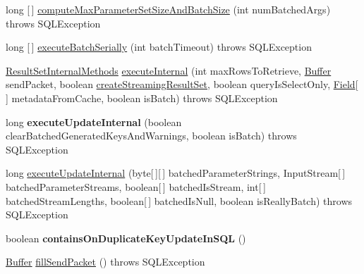 \begin{DoxyCompactItemize}
long \mbox{[}$\,$\mbox{]} \mbox{\hyperlink{classcom_1_1mysql_1_1jdbc_1_1_prepared_statement_a0bd3fe8e5e85dd522b3d84fb68b142ff}{compute\+Max\+Parameter\+Set\+Size\+And\+Batch\+Size}} (int num\+Batched\+Args)  throws S\+Q\+L\+Exception 
\item 
long \mbox{[}$\,$\mbox{]} \mbox{\hyperlink{classcom_1_1mysql_1_1jdbc_1_1_prepared_statement_a0a87e79e103adae56e63a967e64c167c}{execute\+Batch\+Serially}} (int batch\+Timeout)  throws S\+Q\+L\+Exception 
\item 
\mbox{\hyperlink{interfacecom_1_1mysql_1_1jdbc_1_1_result_set_internal_methods}{Result\+Set\+Internal\+Methods}} \mbox{\hyperlink{classcom_1_1mysql_1_1jdbc_1_1_prepared_statement_a7d300759d88bba2536598e70808c3b6b}{execute\+Internal}} (int max\+Rows\+To\+Retrieve, \mbox{\hyperlink{classcom_1_1mysql_1_1jdbc_1_1_buffer}{Buffer}} send\+Packet, boolean \mbox{\hyperlink{classcom_1_1mysql_1_1jdbc_1_1_statement_impl_a642ade7ecee90913b8de38602c43ce20}{create\+Streaming\+Result\+Set}}, boolean query\+Is\+Select\+Only, \mbox{\hyperlink{classcom_1_1mysql_1_1jdbc_1_1_field}{Field}}\mbox{[}$\,$\mbox{]} metadata\+From\+Cache, boolean is\+Batch)  throws S\+Q\+L\+Exception 
\item 
\mbox{\label{classcom_1_1mysql_1_1jdbc_1_1_prepared_statement_a1ff3ce7d3fe991d135b40794bf799938}} 
long {\bfseries execute\+Update\+Internal} (boolean clear\+Batched\+Generated\+Keys\+And\+Warnings, boolean is\+Batch)  throws S\+Q\+L\+Exception 
\item 
long \mbox{\hyperlink{classcom_1_1mysql_1_1jdbc_1_1_prepared_statement_a5f77388e9afc0a2fcb248732c3c91577}{execute\+Update\+Internal}} (byte\mbox{[}$\,$\mbox{]}\mbox{[}$\,$\mbox{]} batched\+Parameter\+Strings, Input\+Stream\mbox{[}$\,$\mbox{]} batched\+Parameter\+Streams, boolean\mbox{[}$\,$\mbox{]} batched\+Is\+Stream, int\mbox{[}$\,$\mbox{]} batched\+Stream\+Lengths, boolean\mbox{[}$\,$\mbox{]} batched\+Is\+Null, boolean is\+Really\+Batch)  throws S\+Q\+L\+Exception 
\item 
\mbox{\label{classcom_1_1mysql_1_1jdbc_1_1_prepared_statement_af7bcac5db19e2993b3edf7033aed5d51}} 
boolean {\bfseries contains\+On\+Duplicate\+Key\+Update\+In\+S\+QL} ()
\item 
\mbox{\hyperlink{classcom_1_1mysql_1_1jdbc_1_1_buffer}{Buffer}} \mbox{\hyperlink{classcom_1_1mysql_1_1jdbc_1_1_prepared_statement_a0f1235a6e911d9370ef27e6ba5932d89}{fill\+Send\+Packet}} ()  throws S\+Q\+L\+Exception 

\end{DoxyCompactItemize}
